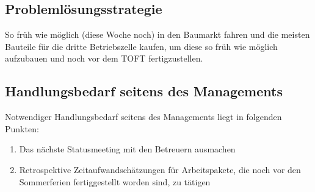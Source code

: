 \documentclass[
	headings=optiontotocandhead,%
	oneside,
	numbers=noenddot,%
	toc=flat, %
	10pt, %
	parskip=full, %
	listof=totoc, %
	listof=flat, %
	numbers=noenddot, %
	bibliography=totoc, %
	a4paper,DIV=14,
]{scrartcl}
\begin{document}
\subsection{Problemlösungsstrategie}
So früh wie möglich (diese Woche noch) in den Baumarkt fahren und die meisten Bauteile für die dritte Betriebszelle kaufen, um diese so früh wie möglich aufzubauen und noch vor dem TOFT fertigzustellen.

\subsection{Handlungsbedarf seitens des Managements}
Notwendiger Handlungsbedarf seitens des Managements liegt in folgenden Punkten:

\begin{enumerate}
	\item Das nächste Statusmeeting mit den Betreuern ausmachen
	\item Retrospektive Zeitaufwandschätzungen für Arbeitspakete, die noch vor den Sommerferien fertiggestellt worden sind, zu tätigen
\end{enumerate}

\clearpage
\end{document}
